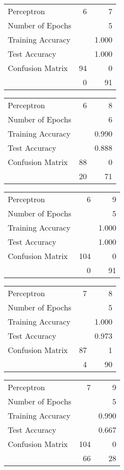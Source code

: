 \documentclass[11pt]{article}
\begin{document}
\begin{minipage}[t]{0.5\textwidth}
\begin{tabular}{|l | r r|}
\hline Perceptron & 6 & 7\\
Number of Epochs & & 5\\
Training Accuracy & & 1.000\\
Test Accuracy & & 1.000\\
Confusion Matrix & 94 & 0\\
 &0 & 91\\ \hline
\end{tabular}
\end{minipage}
\begin{minipage}[t]{0.5\textwidth}
\begin{tabular}{|l | r r|}
\hline Perceptron & 6 & 8\\
Number of Epochs & & 6\\
Training Accuracy & & 0.990\\
Test Accuracy & & 0.888\\
Confusion Matrix & 88 & 0\\
 &20 & 71\\ \hline
\end{tabular}
\end{minipage}
\begin{minipage}[t]{0.5\textwidth}
\begin{tabular}{|l | r r|}
\hline Perceptron & 6 & 9\\
Number of Epochs & & 5\\
Training Accuracy & & 1.000\\
Test Accuracy & & 1.000\\
Confusion Matrix & 104 & 0\\
 &0 & 91\\ \hline
\end{tabular}
\end{minipage}
\begin{minipage}[t]{0.5\textwidth}
\begin{tabular}{|l | r r|}
\hline Perceptron & 7 & 8\\
Number of Epochs & & 5\\
Training Accuracy & & 1.000\\
Test Accuracy & & 0.973\\
Confusion Matrix & 87 & 1\\
 &4 & 90\\ \hline
\end{tabular}
\end{minipage}
\begin{minipage}[t]{0.5\textwidth}
\begin{tabular}{|l | r r|}
\hline Perceptron & 7 & 9\\
Number of Epochs & & 5\\
Training Accuracy & & 0.990\\
Test Accuracy & & 0.667\\
Confusion Matrix & 104 & 0\\
 &66 & 28\\ \hline
\end{tabular}
\end{minipage}
\end{document}

